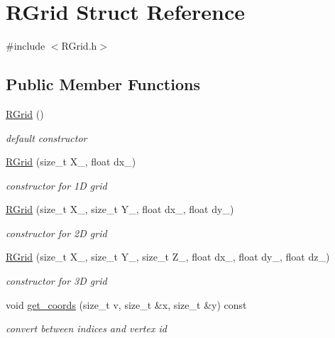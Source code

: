 \hypertarget{struct_r_grid}{}\section{R\+Grid Struct Reference}
\label{struct_r_grid}


{\ttfamily \#include $<$R\+Grid.\+h$>$}

\subsection*{Public Member Functions}
\begin{DoxyCompactItemize}
\item 
\hyperlink{struct_r_grid_a6aa4cd36e06dbbc4e0672492b5738e61}{R\+Grid} ()
\begin{DoxyCompactList}\small\item\em default constructor \end{DoxyCompactList}\item 
\hyperlink{struct_r_grid_a3ad88c5a461228dd08aa2d8b1a3dd846}{R\+Grid} (size\+\_\+t X\+\_\+, float dx\+\_\+)
\begin{DoxyCompactList}\small\item\em constructor for 1\+D grid \end{DoxyCompactList}\item 
\hyperlink{struct_r_grid_a5e90c70fb49f11dc057257f3db67548e}{R\+Grid} (size\+\_\+t X\+\_\+, size\+\_\+t Y\+\_\+, float dx\+\_\+, float dy\+\_\+)
\begin{DoxyCompactList}\small\item\em constructor for 2\+D grid \end{DoxyCompactList}\item 
\hyperlink{struct_r_grid_a1a85f014601014fe7b0465588ea69b79}{R\+Grid} (size\+\_\+t X\+\_\+, size\+\_\+t Y\+\_\+, size\+\_\+t Z\+\_\+, float dx\+\_\+, float dy\+\_\+, float dz\+\_\+)
\begin{DoxyCompactList}\small\item\em constructor for 3\+D grid \end{DoxyCompactList}\item 
void \hyperlink{struct_r_grid_a0111bcb7fde4e8e71f6c5d08a13a2ed6}{get\+\_\+coords} (size\+\_\+t v, size\+\_\+t \&x, size\+\_\+t \&y) const 
\begin{DoxyCompactList}\small\item\em convert between indices and vertex id \end{DoxyCompactList}\item 

\end{DoxyCompactItemize}

